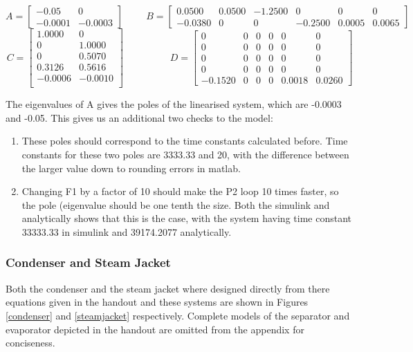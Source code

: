 \documentclass[11pt]{article}
\begin{document}
\[
A = 
\begin{bmatrix}
-0.05 & 0 \\
-0.0001 & -0.0003
\end{bmatrix}
\hspace{1cm}
B = 
\begin{bmatrix}
0.0500 & 0.0500 & -1.2500 & 0 & 0 & 0\\
-0.0380 & 0 & 0 & -0.2500 & 0.0005 & 0.0065
\end{bmatrix}
\]
\[
C = 
\begin{bmatrix}
    1.0000&         0\\
         0&    1.0000\\
         0&    0.5070\\
    0.3126&    0.5616\\
   -0.0006&   -0.0010\\

\end{bmatrix}
\hspace{2cm}
D = 
\begin{bmatrix}
0&         0&         0&         0&         0&         0\\
0&         0&         0&         0&         0&         0\\
0&         0&         0&         0&         0&         0\\
0&         0&         0&         0&         0&         0\\
-0.1520 &        0&         0&         0&    0.0018&    0.0260

\end{bmatrix}
\]

The eigenvalues of A gives the poles of the linearised system, which are -0.0003 and -0.05. This gives us an additional two checks to the model: 
\begin{enumerate}
\item These poles should correspond to the time constants calculated before. Time constants for these two poles are 3333.33 and 20, with the difference between the larger value down to rounding errors in matlab.
\item Changing F1 by a factor of 10 should make the P2 loop 10 times faster, so the pole (eigenvalue should be one tenth the size. Both the simulink and analytically shows that this is the case, with the system having time constant 33333.33 in simulink and 39174.2077 analytically.
\end{enumerate}

\subsubsection{Condenser and Steam Jacket}
Both the condenser and the steam jacket where designed directly from there equations given in the handout and these systems are shown in Figures \ref{condenser} and \ref{steamjacket} respectively. Complete models of the separator and evaporator depicted in the handout are omitted from the appendix for conciseness.
\end{document}
